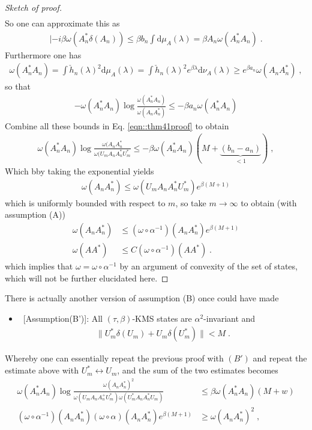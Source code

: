 \documentclass[
a4paper, %
11pt, %
onecolumn, %
openany, %
]{memoir}
\theoremstyle{definition}
\theoremstyle{remark}
\theoremstyle{plain}
\begin{document}
\begin{proof}[Sketch of proof]
\begin{align}
\end{align}
So one can approximate this as \begin{align}
|-i\beta\omega(A_n^*\delta(A_n))\leq \beta b_n\int\mathrm{d}\mu_A(\lambda)=\beta A_n \omega(A_n^*A_n)\;.
\end{align}
Furthermore one has \begin{align}
\omega(A_n^*A_n)=\int \check{h}_n(\lambda)^2\mathrm{d}\mu_A(\lambda)=\int \check{h}_n(\lambda)^2e^{\beta \lambda}\mathrm{d}\nu_A(\lambda)\geq e^{\beta a_n}\omega(A_nA_n^*)\; ,
\end{align}
so that \begin{align}
-\omega(A_n^*A_n)\log \frac{\omega(A_n^*A_n)}{\omega(A_nA_n^*)}\leq -\beta a_n\omega(A_n^*A_n)
\end{align}
Combine all these bounds in Eq. \eqref{eqn::thm41proof} to obtain \begin{align}
\omega(A^*_nA_n)\log \frac{\omega(A_nA_n^*}{\omega(U_mA_nA_n^*U_m^*}\leq -\beta \omega (A_n^*A_n)(M+\underbrace{(b_n-a_n)}_{<1})\; ,
\end{align}
Which bby taking the exponential yields \begin{align}
\omega(A_nA_n^*)\leq \omega(U_mA_nA_n^*U_m^*)e^{\beta(M+1)}
\end{align}
which is uniformly bounded with respect to $m$, so take $m\rightarrow\infty$ to obtain (with assumption (A)) \begin{align}
\omega(A_nA_n^*)&\leq (\omega\circ\alpha^{-1})(A_nA_n^*)e^{\beta(M+1)}\\
\omega(AA^*)&\leq C(\omega\circ\alpha^{-1})(AA^*)\;.
\end{align}
which implies that $\omega=\omega\circ \alpha^{-1}$ by an argument of convexity of the set of states, which will not be further elucidated here.
\end{proof}
There is actually another version of assumption (B) once could have made \begin{itemize}
\item~[Assumption(B')]: All $(\tau,\beta)$-KMS states are $\alpha^2$-invariant and \begin{align}
\|U_m^*\delta(U_m)+U_m\delta(U_m^*)\|< M\;.
\end{align}\end{itemize}
Whereby one can essentially repeat the previous proof with $(B')$ and repeat the estimate above with $U_m^*\leftrightarrow U_m$, and the sum of the two estimates becomes \begin{align}
\omega(A^*_nA_n)\log\frac{\omega(A_nA_n^*)^2}{\omega(U_mA_nA_n^+U_m^*)\omega(U_m^*A_nA_n^*U_m)}&\leq \beta\omega(A_n^*A_n)(M+w)\\
(\omega\circ\alpha^{-1})(A_nA_n^*)(\omega\circ\alpha)(A_nA_n^*)e^{\beta(M+1)}&\geq \omega(A_nA_n^*)^2\; ,
\end{align}
\end{document}
